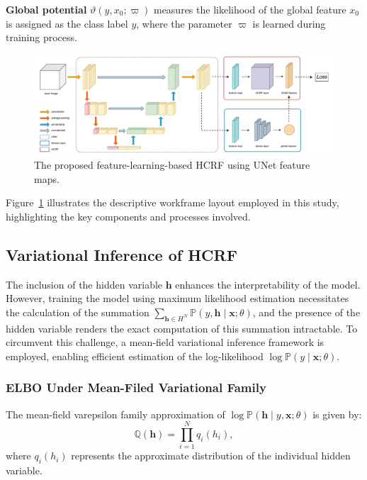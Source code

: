 \documentclass[conference]{IEEEtran}
\newcommand{\hb}{\mathbf{h}}
\newcommand{\PP}{{\mathbb{P}}}
\newcommand{\QQ}{{\mathbb{Q}}}
\newcommand{\xb}{\mathbf{x}}
\let\oldsubsubsection\subsubsection
\renewcommand{\subsubsection}[1]{\oldsubsubsection{\textbf{#1}}}
\begin{document}
\textbf{Global potential} $\vartheta(y, x_0; \varpi)$ measures the likelihood of
the global feature $x_0$ is assigned as the class label $y$, where the parameter
$\varpi$ is learned during training process.


\begin{figure}[tp]
\centering
\includegraphics[width=\textwidth]{workframe}
\caption{The proposed feature-learning-based HCRF using UNet feature maps.}
\label{fig:workframe}
\end{figure}


Figure~\ref{fig:workframe} illustrates the descriptive workframe layout
employed in this study, highlighting the key components and processes involved.


\subsection{Variational Inference of HCRF}


The inclusion of the hidden variable $\hb$ enhances the interpretability of the
model. However, training the model using maximum likelihood estimation
necessitates the calculation of the summation
$\sum_{\hb \in H^N} \PP(y, \hb \mid \xb; \theta)$, and the presence of the
hidden variable renders the exact computation of this summation intractable.
To circumvent this challenge, a mean-field variational inference framework is
employed, enabling efficient estimation of the log-likelihood
$\log \PP(y \mid \xb; \theta)$.


\subsubsection{ELBO Under Mean-Filed Variational Family}


The mean-field varepsilon family approximation of
$\log \PP(\hb \mid y, \xb; \theta)$ is given by:
\begin{equation*}
\QQ(\hb) = \prod_{i=1}^N q_i(h_i),
\end{equation*}
where $q_i(h_i)$ represents the approximate distribution of the individual
hidden variable.
\end{document}
